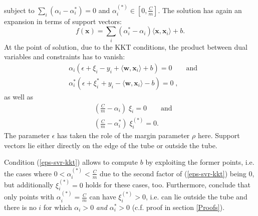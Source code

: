 \documentclass[a4paper,10pt]{article}
\begin{document}
subject to $\sum_i(\alpha_i-\alpha_i^*)=0$ and $\alpha_i^{(*)} \in [0,\frac{C}{m}]$. The solution has again an expansion in terms of support vectors: 
\begin{equation}
 f(\mathbf{x})=\sum_i(\alpha_i^*-\alpha_i)\langle\mathbf{x},\mathbf{x}_i\rangle + b.
\end{equation} 
At the point of solution, due to the KKT conditions, the product between dual variables and constraints has to vanish:
\begin{equation}
\label{eps-svr-kkt}
 \begin{split}
  &\alpha_i(\epsilon+\xi_i-y_i+ \langle\mathbf{w},\mathbf{x}_i\rangle +b) = 0\qquad\text{and}\\
  &\alpha_i^*(\epsilon+\xi_i^*+y_i- \langle\mathbf{w},\mathbf{x}_i\rangle -b) = 0\;,
 \end{split}
\end{equation} 
as well as 
\begin{equation}
 \begin{split}
  &(\frac{C}{m}-\alpha_i)\; \xi_i = 0\qquad\text{and} \\
  &(\frac{C}{m}-\alpha_i^*)\; \xi_i^{(*)} = 0.
 \end{split}
\end{equation}
The parameter $\epsilon$ has taken the role of the margin parameter $\rho$ here. Support vectors lie either directly on the edge of the tube or outside the tube. 

Condition (\ref{eps-svr-kkt}) allows to compute $b$ by exploiting the former points, i.e. the cases where $0<\alpha_i^{(*)}<\frac{C}{m}$ due to the second factor of (\ref{eps-svr-kkt}) being 0, but additionally $\xi_i^{(*)}=0$ holds for these cases, too. 
Furthermore, conclude that only points with $\alpha_i^{(*)}=\frac{C}{m}$ can have $\xi_i^{(*)} > 0$, i.e. can lie outside the tube and there is no $i$ for which $\alpha_i>0$ \textit{and} $\alpha_i^*>0$ (c.f. proof in section \ref{Proofs}).
\end{document}

